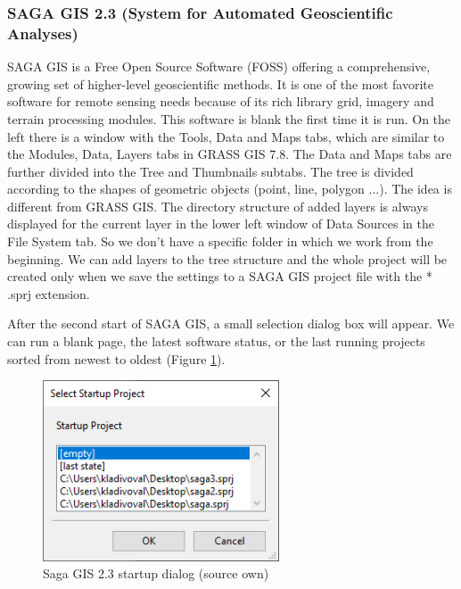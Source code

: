 \documentclass[a4paper,10pt,twoside]{article}
\begin{document}
\newpage
\vspace*{-1cm}
\subsubsection{SAGA GIS 2.3 (System for Automated Geoscientific Analyses)}
\noindent
\large
SAGA GIS is a Free Open Source Software (FOSS) offering a comprehensive, growing set of higher-level geoscientific methods. It is one of the most favorite software for remote sensing needs because of its rich library grid, imagery and terrain processing modules.
This software is blank the first time it is run. On the left there is a window with the Tools, Data and Maps tabs, which are similar to the Modules, Data, Layers tabs in GRASS GIS 7.8. The Data and Maps tabs are further divided into the Tree and Thumbnails subtabs. The tree is divided according to the shapes of geometric objects (point, line, polygon ...). The idea is different from GRASS GIS. The directory structure of added layers is always displayed for the current layer in the lower left window of Data Sources in the File System tab. So we don't have a specific folder in which we work from the beginning. We can add layers to the tree structure and the whole project will be created only when we save the settings to a SAGA GIS project file with the * .sprj extension.

After the second start of SAGA GIS, a small selection dialog box will appear. We can run a blank page, the latest software status, or the last running projects sorted from newest to oldest (Figure \ref{fig:saga_startup}).

\vspace{0.3cm}
\begin{figure}[hbt!] 
\begin{center}
\includegraphics[width=7cm]{../pictures/saga_startup.png} 
\caption[Saga GIS 2.3 startup dialog (source own)]{Saga GIS 2.3 startup dialog (source own)}
\label{fig:saga_startup}
\end{center}
\end{figure}
\end{document}
